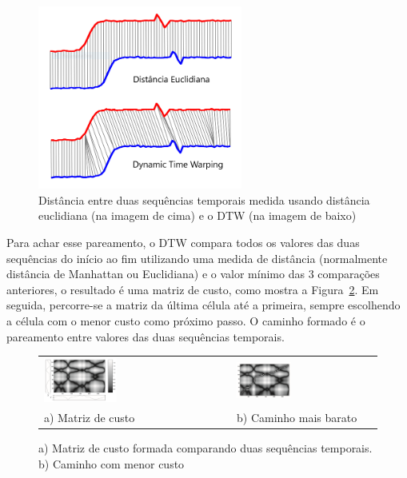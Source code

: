 \begin{figure}[h]
    \centering
    \caption{Distância entre duas sequências temporais medida usando distância euclidiana (na imagem de cima) e o DTW (na imagem de baixo)}
    \label{fig:dist-comparacao}
    \includegraphics[width=0.6\textwidth]{dados/figuras/dtw-euclidiana}
\end{figure}

Para achar esse pareamento, o DTW compara todos os valores das duas sequências do início ao fim utilizando uma medida de distância (normalmente distância de Manhattan ou Euclidiana) e o valor mínimo das 3 comparações anteriores, o resultado é uma matriz de custo, como mostra a Figura~\ref{fig:dtw-caminho}. Em seguida, percorre-se a matriz da última célula até a primeira, sempre escolhendo a célula com o menor custo como próximo passo. O caminho formado é o pareamento entre valores das duas sequências temporais.


\begin{figure}[h]
    \centering
    \caption{a) Matriz de custo formada comparando duas sequências temporais. b) Caminho com menor custo}
    \label{fig:dtw-caminho}
    \begin{tabular}{ll}
    \includegraphics[width=0.4\textwidth]{dados/figuras/dtw-comparacao} &
    \includegraphics[width=0.4\textwidth]{dados/figuras/dtw-comparacao-caminho} \\
    a) Matriz de custo & b) Caminho mais barato
    \end{tabular}
\end{figure}

